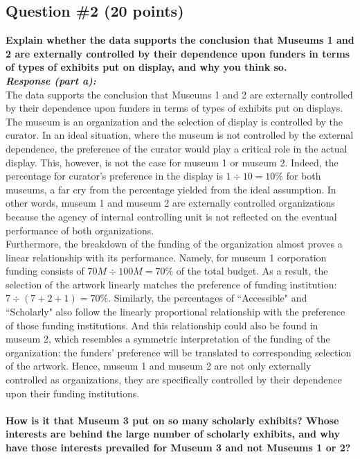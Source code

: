 \documentclass[12pt]{article}
\newcommand\tab[1][1cm]{\hspace*{#1}}
\begin{document}
\subsection*{Question \#2 (20 points)}
\textbf{Explain whether the data supports the conclusion that Museums 1 and 2 are externally controlled by their dependence upon funders in terms of types of exhibits put on display, and why you think so.}\\
\textbf{\emph{Response (part a): }} \\
\tab The data supports the conclusion that Museums 1 and 2 are externally controlled by their dependence upon funders in terms of types of exhibits put on displays. \\
\tab The museum is an organization and the selection of display is controlled by the curator. In an ideal situation, where the museum is not controlled by the external dependence, the preference of the curator would play a critical role in the actual display. This, however, is not the case for museum 1 or museum 2. Indeed, the percentage for curator's preference in the display is $1 \div 10 = 10\%$ for both museums, a far cry from the percentage yielded from the ideal assumption. In other words, museum 1 and museum 2 are externally controlled organizations because the agency of internal controlling unit is not reflected on the eventual performance of both organizations. \\
\tab Furthermore, the breakdown of the funding of the organization almost proves a linear relationship with its performance. Namely, for museum 1 corporation funding consists of $70M \div 100M = 70\%$ of the total budget. As a result, the selection of the artwork linearly matches the preference of funding institution: $7 \div (7+2+1) = 70\%$. Similarly, the percentages of ``Accessible" and ``Scholarly" also follow the linearly proportional relationship with the preference of those funding institutions. And this relationship could also be found in museum 2, which resembles a symmetric interpretation of the funding of the organization: the funders' preference will be translated to corresponding selection of the artwork. Hence, museum 1 and museum 2 are not only externally controlled as organizations, they are specifically controlled by their dependence upon their funding institutions.\\
\pagebreak \\
\textbf{How is it that Museum 3 put on so many scholarly exhibits? Whose interests are behind the large number of scholarly exhibits, and why have those interests prevailed for Museum 3 and not Museums 1 or 2?}\\
\end{document}

